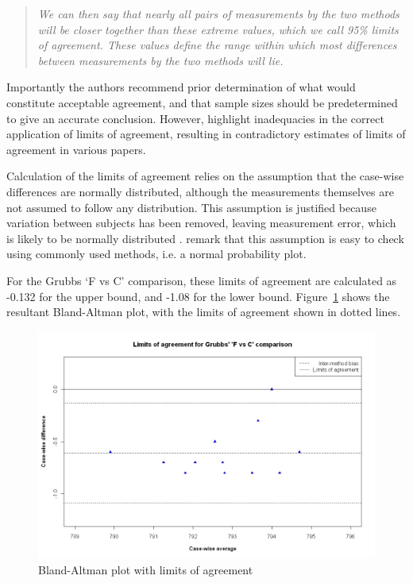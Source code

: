 \documentclass[12pt, a4paper]{report}
\theoremstyle{plain}
\theoremstyle{definition}
\theoremstyle{remark}
\begin{document}
\begin{quote}
\textit{We can then say that nearly all pairs
	of measurements by the two methods will be closer together than
	these extreme values, which we call 95\% limits of agreement.
	These values define the range within which most differences
	between measurements by the two methods will lie.}
\end{quote}

Importantly the authors recommend prior determination of what would constitute acceptable agreement, and that sample sizes should be predetermined to give an accurate conclusion. However, \citet{mantha} highlight inadequacies in the correct application of limits of agreement, resulting in contradictory estimates of limits of agreement in various papers.


Calculation of the limits of agreement relies on the assumption that the case-wise differences are normally distributed, although the measurements themselves are not assumed to follow any distribution. This assumption is justified because variation between subjects has been removed, leaving measurement error, which is likely to be normally distributed \citep{BA86}. \citet{BA99} remark that this assumption is easy to check using commonly used methods, i.e. a normal probability plot. 

For the Grubbs `F vs C' comparison, these limits of agreement are calculated as -0.132 for the upper bound, and -1.08 for the lower bound. Figure~\ref{GrubbsBAplot-noLOA} shows the resultant Bland-Altman plot, with the limits of agreement shown in dotted lines.

\begin{figure}[h!]
	\begin{center}
		\includegraphics[width=125mm]{images/GrubbsBAplot-LOA.jpeg}
		\caption{Bland-Altman plot with limits of agreement}
		\label{GrubbsBAplot-noLOA}
	\end{center}
\end{figure}
\end{document}
